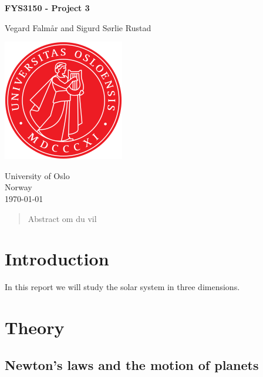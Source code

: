 \documentclass[reprint, english,notitlepage,nofootinbib]{revtex4-1}  %
\begin{document}
\begin{titlepage}
	\begin{center}
	\vspace*{1cm}

	\textbf{FYS3150 - Project 3}

	\vspace{0.5cm}
	Vegard Falmår and Sigurd Sørlie Rustad
	
	\vspace{1cm}
	\includegraphics[scale=0.5]{UIO}
	\vspace{0.8cm}

	University of Oslo\\
	Norway\\
	\today	
		
	\end{center}
	\tableofcontents
	\clearpage
\end{titlepage}

\begin{abstract}
Abstract om du vil
\end{abstract}
\maketitle                              %


\section{Introduction}

In this report we will study the solar system in three dimensions.


\section{Theory}

\subsection{Newton's laws and the motion of planets}
\end{document}
